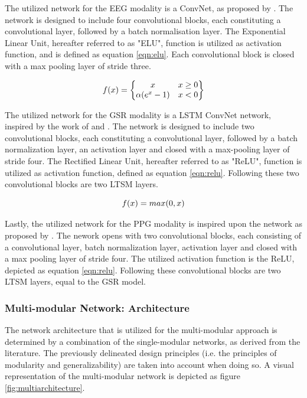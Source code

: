 \documentclass[12pt]{article}
\begin{document}
The utilized network for the EEG modality is a ConvNet, as proposed by . The network is designed to include four convolutional blocks, each constituting a convolutional layer, followed by a batch normalisation layer. The Exponential Linear Unit, hereafter referred to as "ELU", function is utilized as activation function, and is defined as equation \ref{eqn:elu}. Each convolutional block is closed with a max pooling layer of stride three.

\begin{equation}
\label{eqn:elu}
f(x)= 
\begin{Bmatrix}
x & x \geq0 \\ 
\alpha (e^x -1) & x<0
\end{Bmatrix}
\bigskip
\end{equation}

The utilized network for the GSR modality is a LSTM ConvNet network, inspired by the work of  and  . The network is designed to include two convolutional blocks, each constituting a convolutional layer, followed by a batch normalization layer, an activation layer and closed with a max-pooling layer of stride four. The Rectified Linear Unit, hereafter referred to as "ReLU", function is utilized as activation function, defined as equation \ref{eqn:relu}. Following these two convolutional blocks are two LTSM layers.

\begin{equation} 
\label{eqn:relu}
f(x)=max(0,x)
\bigskip
\end{equation}

Lastly, the utilized network for the PPG modality is inspired upon the network as proposed by . The nework opens with two convolutional blocks, each consisting of a convolutional layer, batch normalization layer, activation layer and closed with a max pooling layer of stride four. The utilized activation function is the ReLU, depicted as equation \ref{eqn:relu}. Following these convolutional blocks are two LTSM layers, equal to the GSR model. 

\subsubsection{Multi-modular Network: Architecture}
The network architecture that is utilized for the multi-modular approach is determined by a combination of the single-modular networks, as derived from the literature. The previously delineated design principles (i.e. the principles of modularity and generalizability) are taken into account when doing so. A visual representation of the multi-modular network is depicted as figure \ref{fig:multiarchitecture}.
\end{document}
